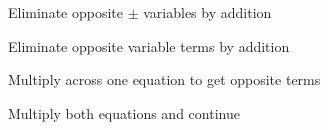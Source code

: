 \documentclass[12pt, a4paper, addpoints]{exam}
\newcommand{\elimination}[6]{%
    \pgfmathsetmacro{\cval}{#3*#1 + #5*#2} %
    \pgfmathsetmacro{\pval}{#4*#1 + #6*#2} %

    \def\formata{%
        \ifnum#3=1
            x
        \else\ifnum#3=-1
            -x
        \else
            \pgfmathprintnumber{#3}x
        \fi\fi}

    \def\formatb{%
        \ifnum#5=1
            +y
        \else\ifnum#5=-1
            -y
        \else
            \ifnum#5<0 \pgfmathprintnumber{#5}y \else +\pgfmathprintnumber{#5}y \fi
        \fi\fi}

    \def\formatd{%
        \ifnum#4=1
            x
        \else\ifnum#4=-1
            -x
        \else
            \pgfmathprintnumber{#4}x
        \fi\fi}

    \def\formate{%
        \ifnum#6=1
            +y
        \else\ifnum#6=-1
            -y
        \else
            \ifnum#6<0 \pgfmathprintnumber{#6}y \else +\pgfmathprintnumber{#6}y \fi
        \fi\fi}

    \[
    \begin{aligned}
    \formata \formatb &= \pgfmathprintnumber{\cval} \\[-1pt]
    \formatd \formate &= \pgfmathprintnumber{\pval}
    \end{aligned}
    \]
}
\newcommand{\bs}{\vspace{65mm}}
\newcommand{\verticalspace}{\vspace{51mm}}
\begin{document}
\LARGE
\begin{questions}
\question Eliminate opposite $\pm$ variables
 by addition
\begin{multicols}{2} %

\end{multicols}
\bs
\question Eliminate  opposite  variable terms  by addition
\begin{multicols}{2} %
\end{multicols}
\newpage
 \renewcommand{\verticalspace}{\vspace{71mm}}
\bs
\question Multiply across one equation to get  opposite terms 
\begin{multicols}{2} %
\end{multicols}
\bs
\question Multiply both equations and continue
\begin{multicols}{2} %
\begin{parts}


\end{parts}
\end{multicols}
\end{questions}
\end{document}
